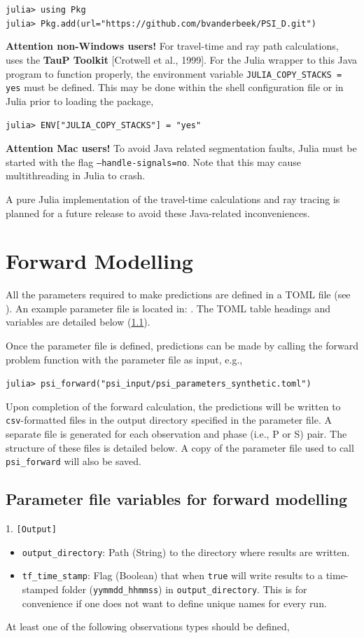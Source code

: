 \texttt{julia> using Pkg} \\
\texttt{julia> Pkg.add(url="https://github.com/bvanderbeek/PSI\_D.git")}

\textbf{Attention non-Windows users!} For travel-time and ray path calculations, \psitomotitle{} uses the \textbf{TauP Toolkit} [Crotwell et al., 1999]. For the Julia wrapper to this Java program to function properly, the environment variable \texttt{JULIA\_COPY\_STACKS = yes} must be defined. This may be done within the shell configuration file or in Julia prior to loading the \psitomotitle{} package,

\texttt{julia> ENV["JULIA\_COPY\_STACKS"] = "yes"}

\textbf{Attention Mac users!} To avoid Java related segmentation faults, Julia must be started with the flag \texttt{---handle-signals=no}. Note that this may cause multithreading in Julia to crash.

A pure Julia implementation of the travel-time calculations and ray tracing is planned for a future release to avoid these Java-related inconveniences.

\section{Forward Modelling} \label{PSI_D:Forward Modelling}

All the parameters required to make predictions are defined in a TOML file (see ). An example parameter file is located in: . The TOML table headings and variables are detailed below (\ref{forward_parameters}).

Once the parameter file is defined, predictions can be made by calling the forward problem function with the parameter file as input, e.g.,

\texttt{julia> psi\_forward("psi\_input/psi\_parameters\_synthetic.toml")}

Upon completion of the forward calculation, the predictions will be written to \texttt{csv}-formatted files in the output directory specified in the parameter file. A separate file is generated for each observation and phase (i.e., P or S) pair. The structure of these files is detailed below. A copy of the parameter file used to call \texttt{psi\_forward} will also be saved.

\subsection{Parameter file variables for forward modelling} \label{forward_parameters}
1. \texttt{[Output]}
\begin{itemize}
\item \texttt{output\_directory}: Path (String) to the directory where results are written.
\item \texttt{tf\_time\_stamp}: Flag (Boolean) that when \texttt{true} will write results to a time-stamped folder (\texttt{yymmdd\_hhmmss}) in \texttt{output\_directory}. This is for convenience if one does not want to define unique names for every run.
\end{itemize}
At least one of the following observations types should be defined,

